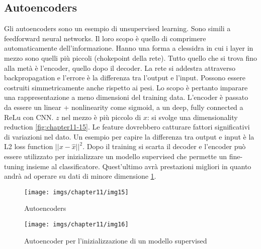 	\subsection{Autoencoders}
	Gli autoencoders sono un esempio di unsupervised learning.
	Sono simili a feedforward neural networks.
	Il loro scopo \`e quello di comprimere automaticamente dell'informazione.
	Hanno una forma a clessidra in cui i layer in mezzo sono quelli pi\`u piccoli (chokepoint della rete).
	Tutto quello che si trova fino alla met\`a \`e l'encoder, quello dopo il decoder.
	La rete si addestra attraverso backpropagation e l'errore \`e la differenza tra l'output e l'input.
	Possono essere costruiti simmetricamente anche rispetto ai pesi.
	Lo scopo \`e pertanto imparare una rappresentazione a meno dimensioni del training data.
	L'encoder \`e passato da essere un linear + nonlinearity come sigmoid, a un deep, fully connected a ReLu con CNN.
	$z$ nel mezzo \`e pi\`u piccolo di $x$: si svolge una dimensionality reduction \ref{fig:chapter11-15}.
	Le feature dovrebbero catturare fattori significativi di variazioni nel dato.
	Un esempio per capire la differenza tra output e input \`e la L2 loss function $||x-\hat{x}||^2$.
	Dopo il training si scarta il decoder e l'encoder pu\`o essere utilizzato per inizializzare un modello supervised che permette un fine-tuning insieme al classificatore. 
	Quest'ultimo avr\`a prestazioni migliori in quanto andr\`a ad operare su dati di minore dimensione \ref{fig:chapter11-16}. 
	
	\begin{figure}
		\centering
		\begin{minipage}{.5\textwidth}
			\centering
			\texttt{[image: imgs/chapter11/img15]}
			\caption{Autoencoders}
			\label{fig:chapter11-15}
		\end{minipage}%
		\begin{minipage}{.5\textwidth}
			\centering
			\texttt{[image: imgs/chapter11/img16]}
			\caption{Autoencoder per l'inizializzazione di un modello supervised}
			\label{fig:chapter11-16}
		\end{minipage}
	\end{figure}